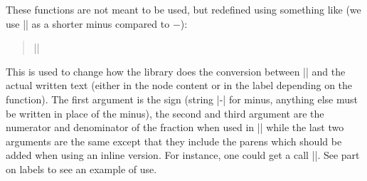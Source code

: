 \documentclass[a4paper,doc2]{ltxdoc} %
\begin{document}
\begin{pgfmanualentry}
  \extractcommand\zxConvertToFracInContent{}\@@
  \extractcommand\zxConvertToFracInLabel\@@
  \pgfmanualbody
  These functions are not meant to be used, but redefined using something like (we use |\zxMinus| as a shorter minus compared to $-$):
\begin{verse}
  ||
\end{verse}
This is used to change how the library does the conversion between |\zxFrac| and the actual written text (either in the node content or in the label depending on the function). The first argument is the sign (string |-| for minus, anything else must be written in place of the minus), the second and third argument are the numerator and denominator of the fraction when used in |\frac{}{}| while the last two arguments are the same except that they include the parens which should be added when using an inline version. For instance, one could get a call ||. See part on labels to see an example of use.
\end{pgfmanualentry}
\end{document}
